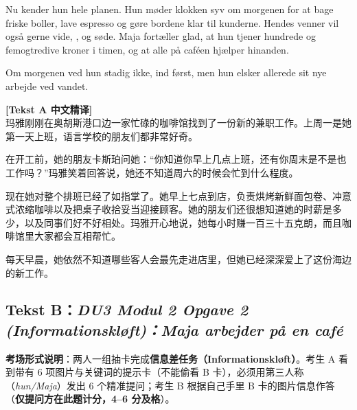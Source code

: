 Nu kender hun hele planen. Hun møder klokken syv om morgenen for at bage friske boller, lave espresso og gøre bordene klar til kunderne. Hendes venner vil også gerne vide,  , og   søde. Maja fortæller glad, at hun tjener hundrede og femogtredive kroner i timen, og at alle på caféen hjælper hinanden.

Om morgenen ved hun stadig ikke,   ind først, men hun elsker allerede sit nye arbejde ved vandet.

\begin{transbox}
\small
\textbf{\color{NCDTeal}[Tekst A 中文精译]}\\
玛雅刚刚在奥胡斯港口边一家忙碌的咖啡馆找到了一份新的兼职工作。上周一是她第一天上班，语言学校的朋友们都非常好奇。

在开工前，她的朋友卡斯珀问她：“你知道你早上几点上班，还有你周末是不是也工作吗？”玛雅笑着回答说，她还不知道周六的时候会忙到什么程度。

现在她对整个排班已经了如指掌了。她早上七点到店，负责烘烤新鲜面包卷、冲意式浓缩咖啡以及把桌子收拾妥当迎接顾客。她的朋友们还很想知道她的时薪是多少，以及同事们好不好相处。玛雅开心地说，她每小时赚一百三十五克朗，而且咖啡馆里大家都会互相帮忙。

每天早晨，她依然不知道哪些客人会最先走进店里，但她已经深深爱上了这份海边的新工作。
\end{transbox}

\subsection*{Tekst B：\textit{DU3 Modul 2 Opgave 2 (Informationskløft)：Maja arbejder på en café}}

\textbf{考场形式说明}：两人一组抽卡完成\textbf{信息差任务（Informationskløft）}。考生 A 看到带有 6 项图片与关键词的提示卡（不能偷看 B 卡），必须用第三人称（\textit{hun/Maja}）发出 6 个精准提问；考生 B 根据自己手里 B 卡的图片信息作答（\textbf{仅提问方在此题计分，4--6 分及格}）。

